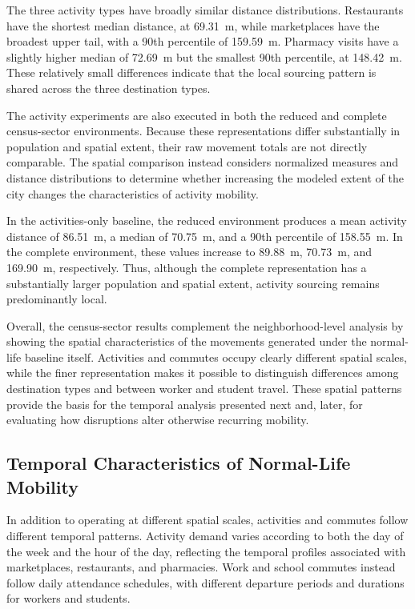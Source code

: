 The three activity types have broadly similar distance distributions. Restaurants have the shortest median distance, at 69.31~m, while marketplaces have the broadest upper tail, with a 90th percentile of 159.59~m. Pharmacy visits have a slightly higher median of 72.69~m but the smallest 90th percentile, at 148.42~m. These relatively small differences indicate that the local sourcing pattern is shared across the three destination types.

The activity experiments are also executed in both the reduced and complete census-sector environments. Because these representations differ substantially in population and spatial extent, their raw movement totals are not directly comparable. The spatial comparison instead considers normalized measures and distance distributions to determine whether increasing the modeled extent of the city changes the characteristics of activity mobility.

In the activities-only baseline, the reduced environment produces a mean activity distance of 86.51~m, a median of 70.75~m, and a 90th percentile of 158.55~m. In the complete environment, these values increase to 89.88~m, 70.73~m, and 169.90~m, respectively. Thus, although the complete representation has a substantially larger population and spatial extent, activity sourcing remains predominantly local.

Overall, the census-sector results complement the neighborhood-level analysis by showing the spatial characteristics of the movements generated under the normal-life baseline itself. Activities and commutes occupy clearly different spatial scales, while the finer representation makes it possible to distinguish differences among destination types and between worker and student travel. These spatial patterns provide the basis for the temporal analysis presented next and, later, for evaluating how disruptions alter otherwise recurring mobility.


\subsection{Temporal Characteristics of Normal-Life Mobility}
\label{sec:routine_mobility_temporal}

In addition to operating at different spatial scales, activities and commutes follow different temporal patterns. Activity demand varies according to both the day of the week and the hour of the day, reflecting the temporal profiles associated with marketplaces, restaurants, and pharmacies. Work and school commutes instead follow daily attendance schedules, with different departure periods and durations for workers and students.

